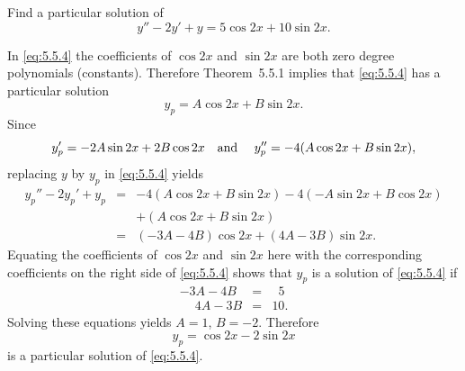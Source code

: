 \setcounter{example}{0}
\setcounter{equation}{3}
\begin{example}
  \label{example:5.5.1} \rm Find a particular solution of
  \begin{equation}
    \label{eq:5.5.4}y''-2y'+y=5\cos2x+10\sin2x.
  \end{equation}
\end{example}
\begin{examplesolution}
\solution In \eqref{eq:5.5.4} the coefficients of $\cos2x$ and $\sin2x$ are both zero degree
polynomials (constants). Therefore Theorem~5.5.1 implies that \eqref{eq:5.5.4} has a
particular solution
\[
  y_{p}=A\cos2x+B\sin2x.
\]
Since
\[
  y_{p}'=-2A\sin2x+2B\cos2x\mbox{\quad and \quad}y_{p}''=-4(A\cos2x+B\sin2x),
\]
replacing $y$ by $y_{p}$ in \eqref{eq:5.5.4} yields
\begin{eqnarray*}
  y_{p}''-2y_{p}'+y_{p} & = & -4(A\cos2x+B\sin2x)-4(-A\sin2x+B\cos2x) \\
                        &   & +(A\cos2x+B\sin2x)                      \\
                        & = & (-3A-4B)\cos2x+(4A-3B)\sin2x.
\end{eqnarray*}
Equating the coefficients of $\cos2x$ and $\sin2x$ here with the corresponding coefficients on the
right side of \eqref{eq:5.5.4} shows that $y_{p}$ is a solution of \eqref{eq:5.5.4} if
\begin{eqnarray*}
  -3A-4B           & = & \phantom{1}5\phantom{.} \\
  \phantom{-}4A-3B & = & 10.
\end{eqnarray*}
Solving these equations yields $A=1$, $B=-2$. Therefore
\[
  y_{p}=\cos2x-2\sin2x
\]
is a particular solution of \eqref{eq:5.5.4}.
\end{examplesolution}

